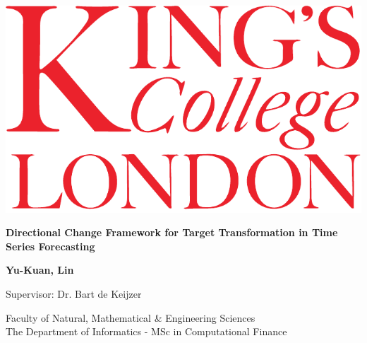 \begin{titlepage}
    \begin{center}

        \includegraphics{./references/images/kcl-eps-converted-to.pdf}

        \vspace*{1cm}

        {\Huge \textbf{Directional Change Framework for Target Transformation in Time Series Forecasting}}
        
        \vspace*{2cm}

        \textbf{Yu-Kuan, Lin}
        
        Supervisor: Dr. Bart de Keijzer
        
        \vfill

        Faculty of Natural, Mathematical \& Engineering Sciences\\The Department of Informatics - MSc in Computational Finance
        
    \end{center}
\end{titlepage}
